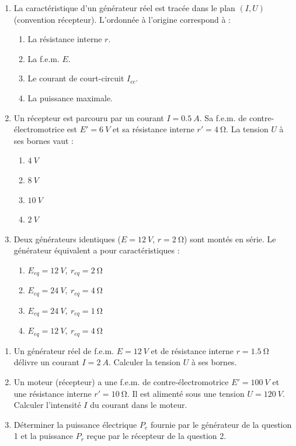 \documentclass[11pt]{article}
\begin{document}
\begin{exercice}
\begin{enumerate}
    \item La caractéristique d'un générateur réel est tracée dans le plan $(I, U)$ (convention récepteur). L'ordonnée à l'origine correspond à :
    \begin{enumerate}
        \item La résistance interne $r$.
        \item La f.e.m. $E$.
        \item Le courant de court-circuit $I_{cc}$.
        \item La puissance maximale.
    \end{enumerate}
    \item Un récepteur est parcouru par un courant $I = \SI{0,5}{A}$. Sa f.e.m. de contre-électromotrice est $E' = \SI{6}{V}$ et sa résistance interne $r' = \SI{4}{\ohm}$. La tension $U$ à ses bornes vaut :
    \begin{enumerate}
        \item $\SI{4}{V}$
        \item $\SI{8}{V}$
        \item $\SI{10}{V}$
        \item $\SI{2}{V}$
    \end{enumerate}
    \item Deux générateurs identiques ($E = \SI{12}{V}$, $r = \SI{2}{\ohm}$) sont montés en série. Le générateur équivalent a pour caractéristiques :
    \begin{enumerate}
        \item $E_{eq} = \SI{12}{V},\ r_{eq} = \SI{2}{\ohm}$
        \item $E_{eq} = \SI{24}{V},\ r_{eq} = \SI{4}{\ohm}$
        \item $E_{eq} = \SI{24}{V},\ r_{eq} = \SI{1}{\ohm}$
        \item $E_{eq} = \SI{12}{V},\ r_{eq} = \SI{4}{\ohm}$
    \end{enumerate}
\end{enumerate}
\end{exercice}

\begin{exercice}
\begin{enumerate}
    \item Un générateur réel de f.e.m. $E = \SI{12}{V}$ et de résistance interne $r = \SI{1,5}{\ohm}$ délivre un courant $I = \SI{2}{A}$. Calculer la tension $U$ à ses bornes.
    \item Un moteur (récepteur) a une f.e.m. de contre-électromotrice $E' = \SI{100}{V}$ et une résistance interne $r' = \SI{10}{\ohm}$. Il est alimenté sous une tension $U = \SI{120}{V}$. Calculer l'intensité $I$ du courant dans le moteur.
    \item Déterminer la puissance électrique $P_e$ fournie par le générateur de la question 1 et la puissance $P_r$ reçue par le récepteur de la question 2.
\end{enumerate}
\end{exercice}
\end{document}
